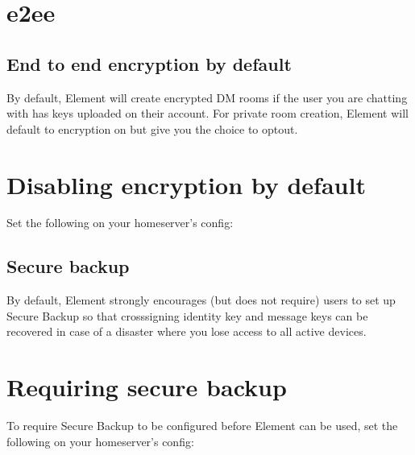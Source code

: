 \documentclass[letterpaper,10pt,openany,oneside,english]{sphinxmanual}
\begin{document}
\chapter{e2ee}
\label{\detokenize{e2ee:e2ee}}\label{\detokenize{e2ee::doc}}

\section{End to end encryption by default}
\label{\detokenize{e2ee:end-to-end-encryption-by-default}}
\sphinxAtStartPar
By default, Element will create encrypted DM rooms if the user you are chatting with has keys uploaded on their account.
For private room creation, Element will default to encryption on but give you the choice to opt\sphinxhyphen{}out.


\chapter{Disabling encryption by default}
\label{\detokenize{e2ee:disabling-encryption-by-default}}
\sphinxAtStartPar
Set the following on your homeserver’s
 config:

\begin{sphinxVerbatim}[commandchars=\\\{\}]
   
     
\end{sphinxVerbatim}


\section{Secure backup}
\label{\detokenize{e2ee:secure-backup}}
\sphinxAtStartPar
By default, Element strongly encourages (but does not require) users to set up
Secure Backup so that cross\sphinxhyphen{}signing identity key and message keys can be
recovered in case of a disaster where you lose access to all active devices.


\chapter{Requiring secure backup}
\label{\detokenize{e2ee:requiring-secure-backup}}
\sphinxAtStartPar
To require Secure Backup to be configured before Element can be used, set the
following on your homeserver’s  config:
\end{document}
